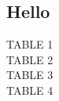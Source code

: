 \documentclass[a4paper]{article}
\date{17 May 2035}
\begin{document}
\begin{center}
\section{Hello}
\scriptsize

TABLE 1\\

\break
\break
\break
TABLE 2\\

\break
\break
\break
TABLE 3\\

\break
\break
\break
TABLE 4\\



\end{center}
\end{document}

